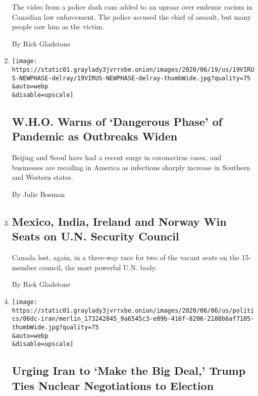 \begin{enumerate}
  The video from a police dash cam added to an uproar over endemic
  racism in Canadian law enforcement. The police accused the chief of
  assault, but many people saw him as the victim.

  By Rick Gladstone
\item
  \href{/2020/06/19/us/coronavirus-new-dangerous-phase.html}{}

  \texttt{[image: https://static01.graylady3jvrrxbe.onion/images/2020/06/19/us/19VIRUS-NEWPHASE-delray/19VIRUS-NEWPHASE-delray-thumbWide.jpg?quality=75\\\&auto=webp\\\&disable=upscale]}

  \hypertarget{who-warns-of-dangerous-phase-of-pandemic-as-outbreaks-widen}{%
  \subsection{W.H.O. Warns of `Dangerous Phase' of Pandemic as Outbreaks
  Widen}\label{who-warns-of-dangerous-phase-of-pandemic-as-outbreaks-widen}}

  Beijing and Seoul have had a recent surge in coronavirus cases, and
  businesses are recoiling in America as infections sharply increase in
  Southern and Western states.

  By Julie Bosman
\item
  \href{/2020/06/17/world/americas/un-security-council-elections.html}{}

  \hypertarget{mexico-india-ireland-and-norway-win-seats-on-un-security-council}{%
  \subsection{Mexico, India, Ireland and Norway Win Seats on U.N.
  Security
  Council}\label{mexico-india-ireland-and-norway-win-seats-on-un-security-council}}

  Canada lost, again, in a three-way race for two of the vacant seats on
  the 15-member council, the most powerful U.N. body.

  By Rick Gladstone
\item
  \href{/2020/06/05/world/middleeast/trump-iran-nuclear.html}{}

  \texttt{[image: https://static01.graylady3jvrrxbe.onion/images/2020/06/06/us/politics/06dc-iran/merlin\_173242845\_9a6545c3-e09b-416f-8206-2108b6af7105-thumbWide.jpg?quality=75\\\&auto=webp\\\&disable=upscale]}

  \hypertarget{urging-iran-to-make-the-big-deal-trump-ties-nuclear-negotiations-to-election}{%
  \subsection{Urging Iran to `Make the Big Deal,' Trump Ties Nuclear
  Negotiations to
  Election}\label{urging-iran-to-make-the-big-deal-trump-ties-nuclear-negotiations-to-election}}


\end{enumerate}
